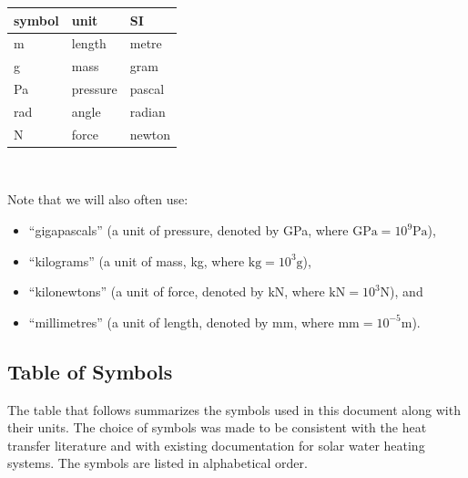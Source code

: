 \documentclass[12pt]{article}
\begin{document}
\begin{center}
    \renewcommand{\arraystretch}{1.2}
    \noindent \begin{tabular}{l l l}
        \toprule
        \textbf{symbol} & \textbf{unit} & \textbf{SI} \\
        \midrule
        \si{\metre}     & length        & metre       \\
        \si{\gram}      & mass          & gram        \\
        \si{\pascal}    & pressure      & pascal      \\
        \si{\radian}    & angle         & radian      \\
        \si{\newton}    & force         & newton      \\
        \bottomrule
    \end{tabular}\\
\end{center}

\noindent{}Note that we will also often use:

\begin{itemize}

    \item ``gigapascals'' (a unit of pressure, denoted by \si{\giga\pascal},
          where \(\si{\giga\pascal}=10^{9}\si{\pascal}\)),

    \item ``kilograms'' (a unit of mass, \si{\kilogram}, where
          \(\si{\kilogram}=10^{3}\si{\gram}\)),

    \item ``kilonewtons'' (a unit of force, denoted by \si{\kilo\newton}, where
          \(\si{\kilo\newton}=10^{3}\si{\newton}\)), and

    \item ``millimetres'' (a unit of length, denoted by \si{\milli\metre}, where
          \(\si{\milli\metre}=10^{-5}\si{\metre}\)).

\end{itemize}

\subsection{Table of Symbols}

The table that follows summarizes the symbols used in this document along with
their units.  The choice of symbols was made to be consistent with the heat
transfer literature and with existing documentation for solar water heating
systems.  The symbols are listed in alphabetical order.
\end{document}
